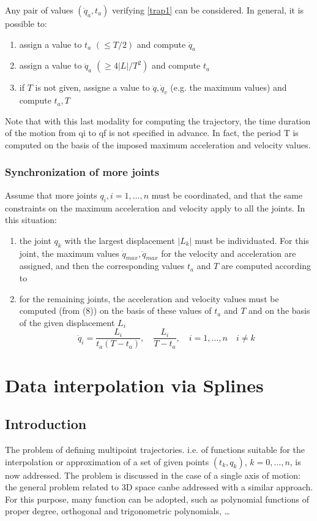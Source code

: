 \documentclass{book}
\begin{document}
Any pair of values $(\ddot{q}_a,t_a)$ verifying \ref{trap1} can be considered. In general, it is possible to:
\begin{enumerate}
  \item assign a value to $t_a$ $(\leq T/2)$ and compute $\ddot{q}_a$ 
  \item assign a value to $\ddot{q}_a$ $(\geq 4|L|/T^2)$ and compute $t_a$ 
  \item if $T$ is not given, assigne a value to $\ddot{q},\dot{q}_v$ (e.g. the maximum values) and compute $t_a,T$
\end{enumerate}


Note that with this last modality for computing the trajectory, the time duration of the motion from qi to qf is not specified in advance. In fact, the period T is computed on the basis of the imposed maximum acceleration and velocity values.
\subsubsection{Synchronization of more joints}
Assume that more joints $q_i,i=1,\dots,n$ must be coordinated, and that the same constraints on the maximum acceleration and velocity apply to all the joints. In this situation:
\begin{enumerate}
  \item the joint $q_k$ with the largest displacement $|L_k|$ must be individuated. For this joint, the maximum values $\dot{q}_{max}, \ddot{q}_{max}$ for the velocity and acceleration are assigned, and then the corresponding values $t_a$ and $T$ are computed according to %
    \item for the remaining joints, the acceleration and velocity values must be computed (from (8)) on the basis of these values of $t_a$ and $T$ and on the basis of the given displacement $L_i$
      \[
        \ddot{q}_i=\displaystyle\frac{L_i}{t_a(T-t_a)}, \quad \displaystyle\frac{L_i}{T-t_a},\quad i=1,\dots,n \quad i\neq k
      \]
\end{enumerate}

\section{Data interpolation via Splines}
\subsection{Introduction}
The problem of defining multipoint trajectories. i.e. of functions suitable for the interpolation or approximation of a set of given points $(t_k,q_k)$, $k=0,\dots,n$, is now addressed. The problem is discussed in the case of a single axis of motion: the general problem related to 3D space canbe addressed with a similar approach. For this purpose, many function can be adopted, such as polynomial functions of proper degree, orthogonal and trigonometric polynomials, \dots 
\end{document}
